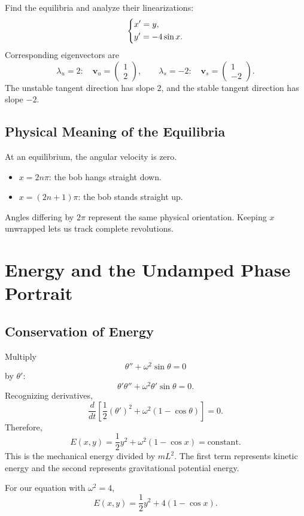 \documentclass[11pt,letterpaper]{article}
\begin{document}
\begin{example}[1]{
Find the equilibria and analyze their linearizations:
\[
\begin{dcases}
x'=y,\\
y'=-4\sin x.
\end{dcases}
\]
}
Corresponding eigenvectors are
\[
\lambda_u=2:
\quad
\mathbf{v}_u=\begin{pmatrix}1\\2\end{pmatrix},
\qquad
\lambda_s=-2:
\quad
\mathbf{v}_s=\begin{pmatrix}1\\-2\end{pmatrix}.
\]
The unstable tangent direction has slope $2$,
and the stable tangent direction has slope $-2$.
\end{example}

\subsection{Physical Meaning of the Equilibria}

At an equilibrium, the angular velocity is zero.

\begin{itemize}
    \item $x=2n\pi$: the bob hangs straight down.
    \item $x=(2n+1)\pi$: the bob stands straight up.
\end{itemize}

Angles differing by $2\pi$ represent the same physical
orientation. Keeping $x$ unwrapped lets us track
complete revolutions.

\section{Energy and the Undamped Phase Portrait}

\subsection{Conservation of Energy}

Multiply
\[
\theta''+\omega^2\sin\theta=0
\]
by $\theta'$:
\[
\theta'\theta''+\omega^2\theta'\sin\theta=0.
\]
Recognizing derivatives,
\[
\frac{d}{dt}
\left[
\frac12(\theta')^2+\omega^2(1-\cos\theta)
\right]=0.
\]
Therefore,
\[
\boxed{
E(x,y)=\frac12y^2+\omega^2(1-\cos x)
=\text{constant}.
}
\]
This is the mechanical energy divided by $mL^2$.
The first term represents kinetic energy and the
second represents gravitational potential energy.

For our equation with $\omega^2=4$,
\[
\boxed{E(x,y)=\frac12y^2+4(1-\cos x).}
\]
\end{document}
